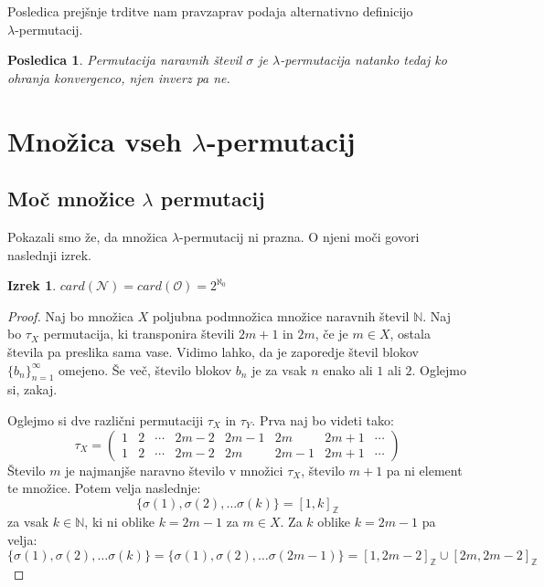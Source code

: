 \documentclass[12pt,a4paper,reqno]{amsart}
\theoremstyle{definition} %
\theoremstyle{plain} %
\newtheorem{izrek}[definicija]{Izrek}
\newtheorem{posledica}[definicija]{Posledica}
\newcommand{\N}{\mathbb N}
\newcommand{\Z}{\mathbb Z}
\begin{document}
Posledica prejšnje trditve nam pravzaprav podaja alternativno definicijo \\$\lambda$-permutacij.

\begin{posledica}
Permutacija naravnih števil $\sigma$ je $\lambda$-permutacija natanko tedaj ko ohranja konvergenco, njen inverz pa ne.
\end{posledica}

\section{Množica vseh $\lambda$-permutacij}

\subsection{Moč množice $\lambda$ permutacij}

Pokazali smo že, da množica $\lambda$-permutacij ni prazna.
O njeni moči govori naslednji izrek.

\begin{izrek}
$card(\mathcal{N})=card(\mathcal{O})=2^{\aleph_0}$
\end{izrek}

\begin{proof}
Naj bo množica $X$ poljubna podmnožica množice naravnih števil $\N$. Naj bo $\tau_X$ permutacija, ki transponira števili $2m+1$ in $2m$, če je $m\in X$, ostala števila pa preslika sama vase. Vidimo lahko, da je zaporedje števil blokov $\{b_n\}_{n=1}^{\infty}$ omejeno. Še več, število blokov $b_n$ je za vsak $n$ enako ali $1$ ali $2$. Oglejmo si, zakaj. 

Oglejmo si dve različni permutaciji $\tau_X$ in $\tau_Y$. Prva naj bo videti tako:
$$\tau_X =
\left(
\begin{array}{cccccccc}
1 & 2 & \cdots & 2m-2 & 2m-1 & 2m & 2m+1 & \cdots \\  
1 & 2 & \cdots & 2m-2 & 2m & 2m-1 & 2m+1 & \cdots
  \end{array}
\right)$$
Število $m$ je najmanjše naravno število v množici $\tau_X$, število $m+1$ pa ni element te množice. Potem velja naslednje:
$$\{ \sigma (1), \sigma (2), \ldots \sigma (k) \} = [1, k]_{\Z}$$
za vsak $k\in \N$, ki ni oblike $k=2m-1$ za $m\in X$. Za $k$ oblike $k=2m-1$ pa velja:
$$\{ \sigma (1), \sigma (2), \ldots \sigma (k) \} =\{ \sigma (1), \sigma (2), \ldots \sigma (2m-1) \}= [1, 2m-2]_{\Z} \cup [2m, 2m-2]_{\Z}$$
\end{proof}
\end{document}
